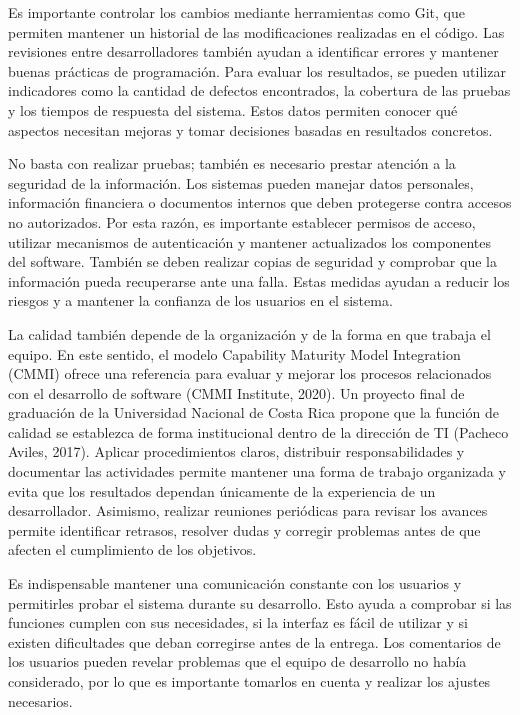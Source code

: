 \documentclass[12pt,letterpaper]{article}
\begin{document}
Es importante controlar los cambios mediante herramientas como Git, que permiten mantener un historial de las modificaciones realizadas en el código. Las revisiones entre desarrolladores también ayudan a identificar errores y mantener buenas prácticas de programación. Para evaluar los resultados, se pueden utilizar indicadores como la cantidad de defectos encontrados, la cobertura de las pruebas y los tiempos de respuesta del sistema. Estos datos permiten conocer qué aspectos necesitan mejoras y tomar decisiones basadas en resultados concretos.

No basta con realizar pruebas; también es necesario prestar atención a la seguridad de la información. Los sistemas pueden manejar datos personales, información financiera o documentos internos que deben protegerse contra accesos no autorizados. Por esta razón, es importante establecer permisos de acceso, utilizar mecanismos de autenticación y mantener actualizados los componentes del software. También se deben realizar copias de seguridad y comprobar que la información pueda recuperarse ante una falla. Estas medidas ayudan a reducir los riesgos y a mantener la confianza de los usuarios en el sistema.

La calidad también depende de la organización y de la forma en que trabaja el equipo. En este sentido, el modelo Capability Maturity Model Integration (CMMI) ofrece una referencia para evaluar y mejorar los procesos relacionados con el desarrollo de software (CMMI Institute, 2020). Un proyecto final de graduación de la Universidad Nacional de Costa Rica propone que la función de calidad se establezca de forma institucional dentro de la dirección de TI (Pacheco Aviles, 2017). Aplicar procedimientos claros, distribuir responsabilidades y documentar las actividades permite mantener una forma de trabajo organizada y evita que los resultados dependan únicamente de la experiencia de un desarrollador. Asimismo, realizar reuniones periódicas para revisar los avances permite identificar retrasos, resolver dudas y corregir problemas antes de que afecten el cumplimiento de los objetivos.

Es indispensable mantener una comunicación constante con los usuarios y permitirles probar el sistema durante su desarrollo. Esto ayuda a comprobar si las funciones cumplen con sus necesidades, si la interfaz es fácil de utilizar y si existen dificultades que deban corregirse antes de la entrega. Los comentarios de los usuarios pueden revelar problemas que el equipo de desarrollo no había considerado, por lo que es importante tomarlos en cuenta y realizar los ajustes necesarios.
\end{document}
